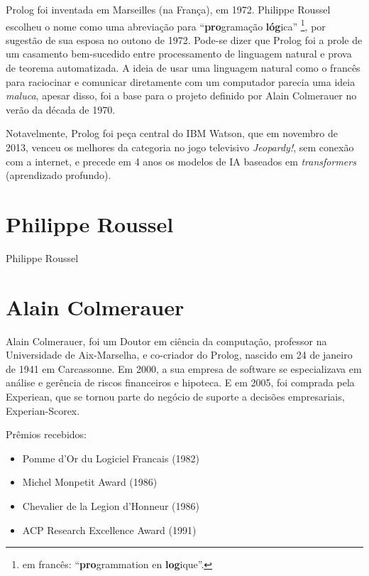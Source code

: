 Prolog foi inventada em Marseilles (na França), em 1972. Philippe Roussel
escolheu o nome como uma abreviação para ``\textbf{pro}gramação
\textbf{lóg}ica'' \footnote{em francês: ``\textbf{pro}grammation en
\textbf{log}ique''.}, por sugestão de sua esposa no outono de 1972. Pode-se
dizer que Prolog foi a prole de um casamento bem-sucedido entre processamento de
linguagem natural e prova de teorema automatizada. A ideia de usar uma linguagem
natural como o francês para raciocinar e comunicar diretamente com um computador
parecia uma ideia \textit{maluca}, apesar disso, foi a base para o projeto
definido por Alain Colmerauer no verão da década de 1970. \cite{Colmerauer1993-cj}

Notavelmente, Prolog foi peça central do IBM Watson, que em novembro de 2013,
venceu os melhores da categoria no jogo televisivo \textit{Jeopardy!}, sem
conexão com a internet, e precede em 4 anos os modelos de IA baseados em
\textit{transformers} (aprendizado profundo). \cite{watson-jeopardy}

\section{Philippe Roussel}
Philippe Roussel 

\section{Alain Colmerauer}
Alain Colmerauer, foi um Doutor em ciência da computação, professor na
Universidade de Aix-Marselha, e co-criador do Prolog, nascido em 24 de janeiro
de 1941 em Carcassonne. Em 2000, a sua empresa de software se especializava em
análise e gerência de riscos financeiros e hipoteca. E em 2005, foi comprada
pela Experiean, que se tornou parte do negócio de suporte a decisões
empresariais, Experian-Scorex. \cite{Alain-Memorian}

Prêmios recebidos:
\begin{itemize}
    \item Pomme d'Or du Logiciel Francais (1982)
    \item Michel Monpetit Award (1986)
    \item Chevalier de la Legion d'Honneur (1986)
    \item ACP Research Excellence Award (1991)
\end{itemize}


